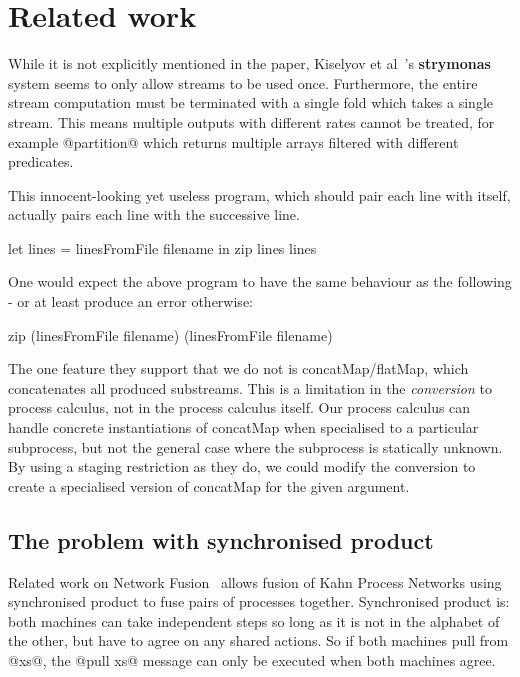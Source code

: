 \section{Related work}


While it is not explicitly mentioned in the paper, Kiselyov et al~\cite{kiselyov2016stream}'s {\bf strymonas} system seems to only allow streams to be used once.
Furthermore, the entire stream computation must be terminated with a single fold which takes a single stream.
This means multiple outputs with different rates cannot be treated, for example @partition@ which returns multiple arrays filtered with different predicates.

This innocent-looking yet useless program, which should pair each line with itself, actually pairs each line with the successive line.
\begin{code}
let lines = linesFromFile filename
in  zip lines lines
\end{code}

One would expect the above program to have the same behaviour as the following - or at least produce an error otherwise:
\begin{code}
zip (linesFromFile filename) (linesFromFile filename)
\end{code}

The one feature they support that we do not is concatMap/flatMap, which concatenates all produced substreams.
This is a limitation in the \emph{conversion} to process calculus, not in the process calculus itself.
Our process calculus can handle concrete instantiations of concatMap when specialised to a particular subprocess, but not the general case where the subprocess is statically unknown.
By using a staging restriction as they do, we could modify the conversion to create a specialised version of concatMap for the given argument.


\subsection{The problem with synchronised product}
Related work on Network Fusion~\cite{fradet2004network} allows fusion of Kahn Process Networks using synchronised product to fuse pairs of processes together.
Synchronised product is: both machines can take independent steps so long as it is not in the alphabet of the other, but have to agree on any shared actions.
So if both machines pull from @xs@, the @pull xs@ message can only be executed when both machines agree.


